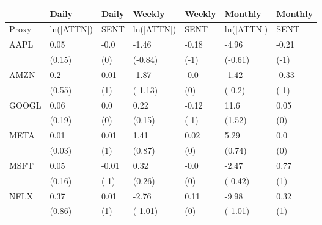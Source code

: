\begin{tabular}{lllllll}
\toprule
{} &       Daily &  Daily &      Weekly & Weekly &     Monthly & Monthly \\
\midrule
Proxy &  ln(|ATTN|) &   SENT &  ln(|ATTN|) &   SENT &  ln(|ATTN|) &    SENT \\
AAPL  &        0.05 &   -0.0 &       -1.46 &  -0.18 &       -4.96 &   -0.21 \\
      &      (0.15) &    (0) &     (-0.84) &   (-1) &     (-0.61) &    (-1) \\
AMZN  &         0.2 &   0.01 &       -1.87 &   -0.0 &       -1.42 &   -0.33 \\
      &      (0.55) &    (1) &     (-1.13) &    (0) &      (-0.2) &    (-1) \\
GOOGL &        0.06 &    0.0 &        0.22 &  -0.12 &        11.6 &    0.05 \\
      &      (0.19) &    (0) &      (0.15) &   (-1) &      (1.52) &     (0) \\
META  &        0.01 &   0.01 &        1.41 &   0.02 &        5.29 &     0.0 \\
      &      (0.03) &    (1) &      (0.87) &    (0) &      (0.74) &     (0) \\
MSFT  &        0.05 &  -0.01 &        0.32 &   -0.0 &       -2.47 &    0.77 \\
      &      (0.16) &   (-1) &      (0.26) &    (0) &     (-0.42) &     (1) \\
NFLX  &        0.37 &   0.01 &       -2.76 &   0.11 &       -9.98 &    0.32 \\
      &      (0.86) &    (1) &     (-1.01) &    (0) &     (-1.01) &     (1) \\
\bottomrule
\end{tabular}
